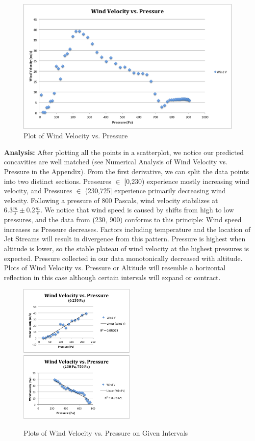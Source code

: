 \documentclass{article}
\begin{document}
\begin{figure}[H]
\centering
\includegraphics[width=\textwidth]{IMG1CDATA.png}
\caption{Plot of Wind Velocity vs. Pressure}
\end{figure}

\begin{flushleft}
\textbf{Analysis:} After plotting all the points in a scatterplot, we notice our predicted concavities are well matched (see Numerical Analysis of Wind Velocity vs. Pressure in the Appendix).  From the first derivative, we can split the data points into two distinct sections.  Pressures $\in$ [0,230) experience mostly increasing wind velocity, and Pressures $\in$ (230,725] experience primarily decreasing wind velocity.  Following a pressure of 800 Pascals, wind velocity stabilizes at $6.3\frac{m}{s} \pm 0.2\frac{m}{s}$.  We notice that wind speed is caused by shifts from high to low pressures, and the data from (230, 900) conforms to this principle: Wind speed increases as Pressure decreases.  Factors including temperature and the location of Jet Streams will result in divergence from this pattern.  Pressure is highest when altitude is lower, so the stable plateau of wind velocity at the highest pressures is expected.  Pressure collected in our data monotonically decreased with altitude.  Plots of Wind Velocity vs. Pressure or Altitude will resemble a horizontal reflection in this case although certain intervals will expand or contract.
\end{flushleft}

\begin{figure}[H]
\centering
\includegraphics[width=2.25in]{LPANDA.png}\hfill \includegraphics[width=2.25in]{RPANDA.png}
\caption{Plots of Wind Velocity vs. Pressure on Given Intervals}
\end{figure}
\end{document}
